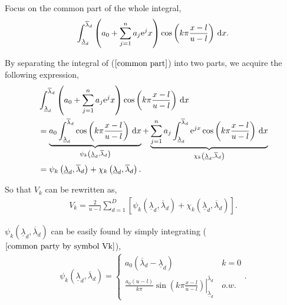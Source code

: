 Focus on the common part of the whole integral,
\begin{align}
    \int_{\underline{\lambda}_d}^{\overline{\lambda}_d}\left(a_0 + \sum_{j=1}^na_j{\rm e}^jx\right)\cos \left(k\pi \frac{x-l}{u-l}\right)\, {\rm d}x. \label{common part}
\end{align}

By separating the integral of ($\ref{common part}$) into two parts, we acquire the following expression,
\begin{align}
     &\int_{\underline{\lambda}_d}^{\overline{\lambda}_d}\left(a_0+\sum_{j=1}^na_j{\rm e}^jx\right)\cos \left(k\pi \frac{x-l}{u-l}\right)\,{\rm d}x \nonumber \\
     & = \underbrace{a_0\int_{\underline{\lambda}_d}^{\overline{\lambda}_d}\cos \left(k\pi\frac{x-l}{u-l}\right)\,{\rm d}x}_{\psi_k\left(\underline{\lambda}_d, \overline{\lambda}_d \right)}+\underbrace{\sum_{j=1}^n a_j \int_{\underline{\lambda}_d}^{\overline{\lambda}_d} {\rm e}^{jx} \cos \left( k \pi \frac{x-l}{u-l} \right) \, {\rm d}x}_{\chi_k\left(\underline{\lambda}_d, \overline{\lambda}_d \right)} \nonumber \\
     & =\psi_k\left(\underline{\lambda}_d,  \overline{\lambda}_d\right)+\chi_k\left(\underline{\lambda}_d, \overline{\lambda}_d \right). \label{common party by symbol Vk}
\end{align}

So that $V_k$ can be rewritten as,
\begin{align}
    V_k=\frac{2}{u-l}\sum_{d=1}^{D}\left[\psi_k\left( \underline{\lambda}_d, \overline{\lambda}_d \right) + \chi_k\left(\underline{\lambda}_d, \overline{\lambda}_d \right) \right].\label{simplify Vk}
\end{align}


$\psi_k\left( \underline{\lambda}_d, \overline{\lambda}_d \right)$ can be easily found by simply integrating ($\ref{common party by symbol Vk}$),
\begin{align}
    \psi_k\left( \underline{\lambda}_d, \overline{\lambda}_d \right)
    =
        \begin{cases}
        a_0\left( \overline{\lambda}_d - \underline{\lambda}_d \right) \, & k=0  \\
        \left.\frac{a_0\left(u-l\right)}{k\pi}\sin\left(k\pi\frac{x-l}{u-l}\right)\right|_{\underline{\lambda}_d}^{\overline{\lambda}_d}\, & o.w.
    \end{cases}. \label{phi}
\end{align}

